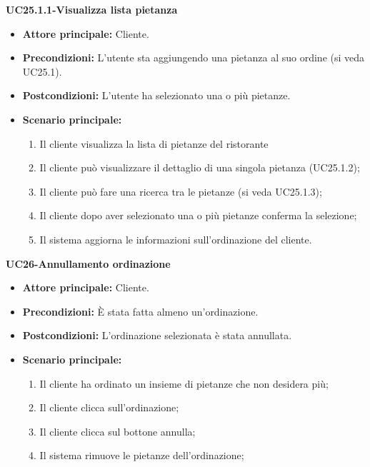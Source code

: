 \textbf{UC25.1.1-Visualizza lista pietanza}
\begin{itemize}
\item \textbf{Attore principale:} Cliente.
\item \textbf{Precondizioni:} L'utente sta aggiungendo una pietanza al suo ordine (si veda UC25.1).
\item \textbf{Postcondizioni:} L'utente ha selezionato una o più pietanze.
\item \textbf{Scenario principale:}
\begin{enumerate}
    \item Il cliente visualizza la lista di pietanze del ristorante
    \item Il cliente può visualizzare il dettaglio di una singola pietanza (UC25.1.2);
    \item Il cliente può fare una ricerca tra le pietanze (si veda UC25.1.3);
    \item Il cliente dopo aver selezionato una o più pietanze conferma la selezione;
    \item Il sistema aggiorna le informazioni sull'ordinazione del cliente.
\end{enumerate}
\end{itemize}


\textbf{UC26-Annullamento ordinazione}
\begin{itemize}
\item \textbf{Attore principale:} Cliente.
\item \textbf{Precondizioni:} È stata fatta almeno un'ordinazione.
\item \textbf{Postcondizioni:} L'ordinazione selezionata è stata annullata.
\item \textbf{Scenario principale:}
\begin{enumerate}
    \item Il cliente ha ordinato un insieme di pietanze che non desidera più;
    \item Il cliente clicca sull'ordinazione;
    \item Il cliente clicca sul bottone annulla;
    \item Il sistema rimuove le pietanze dell'ordinazione;
\end{enumerate}
\end{itemize}
